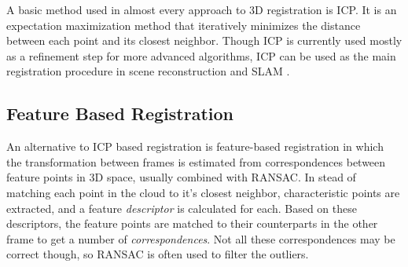 \documentclass[a4paper]{article}
\begin{document}
A basic method used in almost every approach to 3D registration is \ac{ICP}\cite{besl1992method}. It is an expectation maximization method that iteratively minimizes the distance between each point and its closest neighbor. Though \ac{ICP} is currently used mostly as a refinement step for more advanced algorithms, \ac{ICP} can be used as the main registration procedure in scene reconstruction \cite{izadi2011kinectfusion,newcombe2011kinectfusion} and \ac{SLAM} \cite{nuchter20076d}.




\subsection{Feature Based Registration}

An alternative to \ac{ICP} based registration is feature-based registration in which the transformation between frames is estimated from correspondences between feature points in 3D space, usually combined with \ac{RANSAC}. In stead of matching each point in the cloud to it's closest neighbor, characteristic points are extracted, and a feature \emph{descriptor} is calculated for each. Based on these descriptors, the feature points are matched to their counterparts in the other frame to get a number of \emph{correspondences}. Not all these correspondences may be correct though, so \ac{RANSAC} is often used to filter the outliers. 
\end{document}

